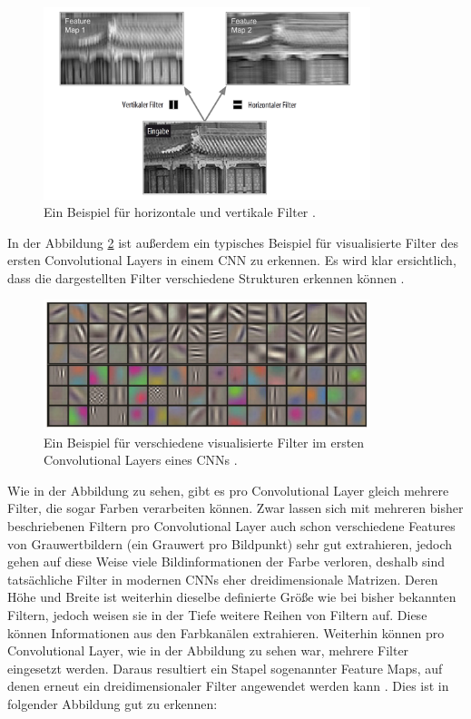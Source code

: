 \documentclass[11pt,bibliography=totocnumbered]{scrartcl}
\begin{document}
\begin{figure}[H]
	\centering
	\includegraphics[width=0.85\textwidth]{filter_example}
	\vspace*{-3mm}
	\caption[Beispiel für horizontale und vertikale Filter]{Ein Beispiel für horizontale und vertikale Filter \cite[S.364]{MACHINE_LEARNING}.}
	\label{fig:cnn_filter_example}
\end{figure}
\vspace*{-5mm}
In der Abbildung \ref{fig:cnn_filter_example_2} ist außerdem ein typisches Beispiel für visualisierte Filter des ersten Convolutional Layers in einem CNN zu erkennen. Es wird klar ersichtlich, dass die dargestellten Filter verschiedene Strukturen erkennen können \cite[S.132]{DEEP_LEARNING_REVOLUTION}.
\begin{figure}[H]
	\centering
	\includegraphics[width=0.85\textwidth]{cnn_filter}
	\vspace*{-3mm}
	\caption[Beispiel für verschiedene visualisierte Filter]{Ein Beispiel für verschiedene visualisierte Filter im ersten Convolutional Layers eines CNNs \cite[S.132]{DEEP_LEARNING_REVOLUTION}.}
	\label{fig:cnn_filter_example_2}
\end{figure}
\vspace*{-5mm} 
Wie in der Abbildung zu sehen, gibt es pro Convolutional Layer gleich mehrere Filter, die sogar Farben verarbeiten können. Zwar lassen sich mit mehreren bisher beschriebenen Filtern pro Convolutional Layer auch schon verschiedene Features von Grauwertbildern (ein Grauwert pro Bildpunkt) sehr gut extrahieren, jedoch gehen auf diese Weise viele Bildinformationen der Farbe verloren, deshalb sind tatsächliche Filter in modernen CNNs eher dreidimensionale Matrizen. Deren Höhe und Breite ist weiterhin dieselbe definierte Größe wie bei bisher bekannten Filtern, jedoch weisen sie in der Tiefe weitere Reihen von Filtern auf. Diese können Informationen aus den Farbkanälen extrahieren. Weiterhin können pro Convolutional Layer, wie in der Abbildung zu sehen war, mehrere Filter eingesetzt werden. Daraus resultiert ein Stapel sogenannter Feature Maps, auf denen erneut ein dreidimensionaler Filter angewendet werden kann \cite[S.364-365]{MACHINE_LEARNING}. Dies ist in folgender Abbildung gut zu erkennen:
\end{document}
